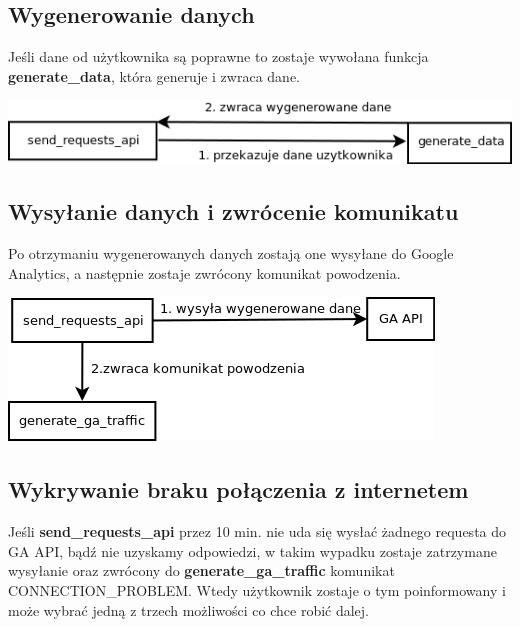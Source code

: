 \documentclass{article}
\begin{document}
\subsection{Wygenerowanie danych}
Jeśli dane od użytkownika są poprawne to zostaje wywołana funkcja \textbf{generate\_data}, która generuje i zwraca dane. 

\begin{center}\includegraphics[scale=0.5]{generate_data}\end{center}

\subsection{Wysyłanie danych i zwrócenie komunikatu}
Po otrzymaniu wygenerowanych danych zostają one wysyłane do Google Analytics, a następnie zostaje zwrócony komunikat powodzenia.

\begin{center}\includegraphics[scale=0.5]{send_data}\end{center}

\subsection{Wykrywanie braku połączenia z internetem}
Jeśli \textbf{send\_requests\_api} przez 10 min. nie uda się wysłać żadnego requesta do GA API, bądź nie uzyskamy odpowiedzi, w takim wypadku zostaje zatrzymane wysyłanie oraz zwrócony do \textbf{generate\_ga\_traffic} komunikat CONNECTION\_PROBLEM\@. Wtedy użytkownik zostaje o tym poinformowany i może wybrać jedną z trzech możliwości co chce robić dalej.
\end{document}
